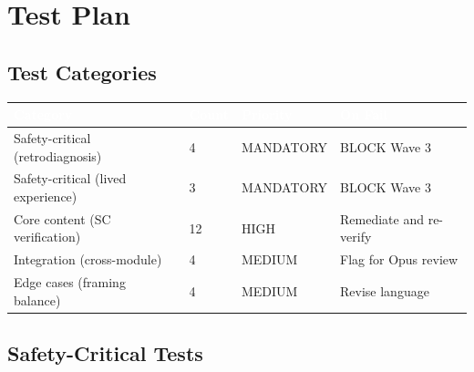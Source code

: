 \documentclass[11pt,letterpaper]{article}
\newcommand{\tableheader}[1]{\textbf{\sffamily\textcolor{white}{#1}}}
\begin{document}
\section{Test Plan}

\subsection{Test Categories}

\begin{center}
\begin{tabularx}{\textwidth}{L{3.5cm}C{1.5cm}L{2.5cm}X}
\toprule
{}
\tableheader{Category} & \tableheader{Count} & \tableheader{Priority} & \tableheader{On Fail} \\
\midrule
Safety-critical (retrodiagnosis) & 4 & MANDATORY & BLOCK Wave 3 \\
Safety-critical (lived experience) & 3 & MANDATORY & BLOCK Wave 3 \\
Core content (SC verification) & 12 & HIGH & Remediate and re-verify \\
Integration (cross-module) & 4 & MEDIUM & Flag for Opus review \\
Edge cases (framing balance) & 4 & MEDIUM & Revise language \\
\bottomrule
\end{tabularx}
\end{center}

\subsection{Safety-Critical Tests}
\end{document}
